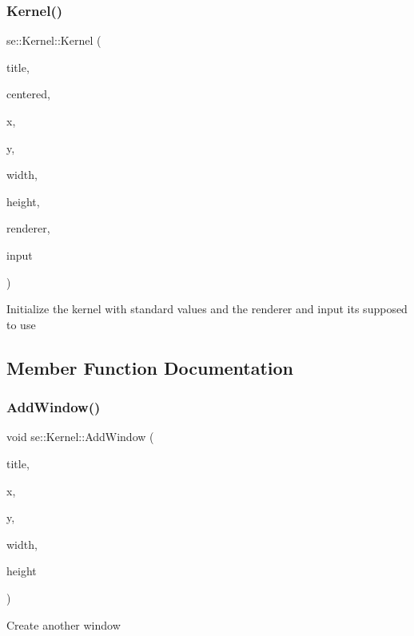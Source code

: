 \subsubsection{\texorpdfstring{Kernel()}{Kernel()}}
{\footnotesize\ttfamily se\+::\+Kernel\+::\+Kernel (\begin{DoxyParamCaption}\item[{const std\+::string \&}]{title,  }\item[{bool}]{centered,  }\item[{int}]{x,  }\item[{int}]{y,  }\item[{int}]{width,  }\item[{int}]{height,  }\item[{\mbox{\hyperlink{classse_1_1_abstract_renderer}{Abstract\+Renderer}} $\ast$}]{renderer,  }\item[{\mbox{\hyperlink{classse_1_1_input}{Input}} $\ast$}]{input }\end{DoxyParamCaption})}

Initialize the kernel with standard values and the renderer and input it\textquotesingle{}s supposed to use 

\subsection{Member Function Documentation}
\mbox{\label{classse_1_1_kernel_aa65f624076feaa97a95901077df35357}} 
\subsubsection{\texorpdfstring{Add\+Window()}{AddWindow()}}
{\footnotesize\ttfamily void se\+::\+Kernel\+::\+Add\+Window (\begin{DoxyParamCaption}\item[{const std\+::string \&}]{title,  }\item[{int}]{x,  }\item[{int}]{y,  }\item[{int}]{width,  }\item[{int}]{height }\end{DoxyParamCaption})}

Create another window \mbox{\label{classse_1_1_kernel_a1faeac6fce02ccd7ff76d94ad78e0754}} 
